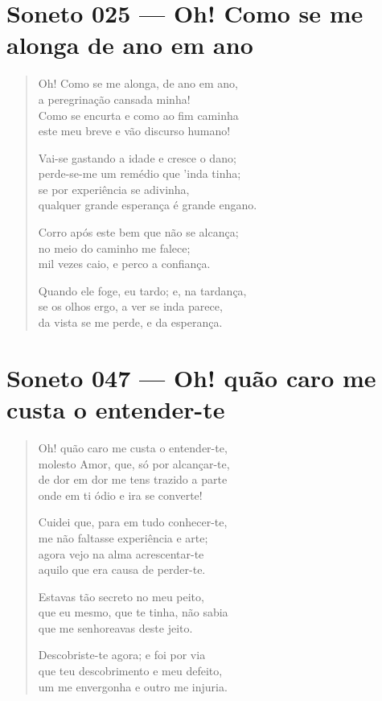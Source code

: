 \documentclass[10pt,a5paper,oneside]{book}
\begin{document}
\chapter{Soneto 025 --- Oh! Como se me alonga de ano em ano}

\begin{verse}
Oh! Como se me alonga, de ano em ano,\\
a peregrinação cansada minha!\\
Como se encurta e como ao fim caminha\\
este meu breve e vão discurso humano!

Vai-se gastando a idade e cresce o dano;\\
perde-se-me um remédio que 'inda tinha;\\
se por experiência se adivinha,\\
qualquer grande esperança é grande engano.

Corro após este bem que não se alcança;\\
no meio do caminho me falece;\\
mil vezes caio, e perco a confiança.

Quando ele foge, eu tardo; e, na tardança,\\
se os olhos ergo, a ver se inda parece,\\
da vista se me perde, e da esperança.
\end{verse}

\chapter{Soneto 047 --- Oh! quão caro me custa o entender-te}

\begin{verse}
Oh! quão caro me custa o entender-te,\\
molesto Amor, que, só por alcançar-te,\\
de dor em dor me tens trazido a parte\\
onde em ti ódio e ira se converte!

Cuidei que, para em tudo conhecer-te,\\
me não faltasse experiência e arte;\\
agora vejo na alma acrescentar-te\\
aquilo que era causa de perder-te.

Estavas tão secreto no meu peito,\\
que eu mesmo, que te tinha, não sabia\\
que me senhoreavas deste jeito.

Descobriste-te agora; e foi por via\\
que teu descobrimento e meu defeito,\\
um me envergonha e outro me injuria.
\end{verse}
\end{document}

